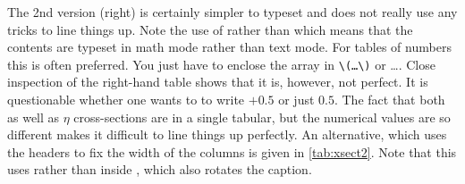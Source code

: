 The 2nd version (right) is certainly simpler to typeset and does not
really use any tricks to line things up. Note the use of 
rather than  which means that the contents are typeset in
math mode rather than text mode. For tables of numbers this is often
preferred. You just have to enclose the array in
\texttt{\textbackslash(\ldots\textbackslash)} or
\ldots{}. Close inspection of the right-hand
table shows that it is, however, not perfect. It is questionable
whether one wants to to write \(+0.5\) or just \(0.5\). The fact that both
\pT as well as \(\eta\) cross-sections are in a single tabular, but the
numerical values are so different makes it difficult to line things up
perfectly. An alternative, which uses the headers to fix the width of
the columns is given in \cref{tab:xsect2}. Note that this uses
 rather than  inside ,
which also rotates the caption.

